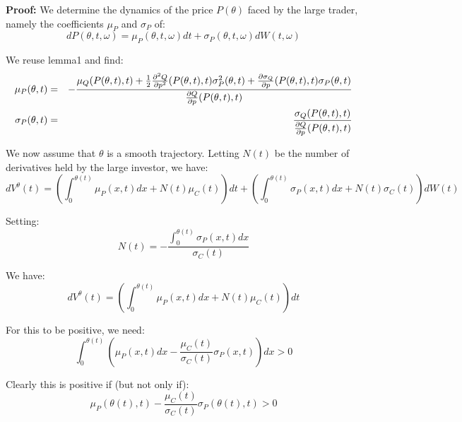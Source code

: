 \documentclass{article}
\begin{document}
\bigskip

\textbf{Proof:} We determine the dynamics of the price $P(\theta )$ faced by
the large trader, namely the coefficients $\mu _{P}$ and $\sigma _{P}$ of:%
\begin{equation*}
dP(\theta ,t,\omega )=\mu _{P}(\theta ,t,\omega )dt+\sigma _{P}(\theta
,t,\omega )dW(t,\omega )
\end{equation*}

We reuse lemma1 and find:%
\begin{eqnarray*}
\mu _{P}(\theta ,t) &=&-\frac{\mu _{Q}(P(\theta ,t),t)+\frac{1}{2}\frac{%
\partial ^{2}Q}{\partial p^{2}}(P(\theta ,t),t)\sigma _{P}^{2}(\theta ,t)+%
\frac{\partial \sigma _{Q}}{\partial p}(P(\theta ,t),t)\sigma _{P}(\theta ,t)%
}{\frac{\partial Q}{\partial p}(P(\theta ,t),t)} \\
\sigma _{P}(\theta ,t) &=&\frac{\sigma _{Q}(P(\theta ,t),t)}{\frac{\partial Q%
}{\partial p}(P(\theta ,t),t)}
\end{eqnarray*}

We now assume that $\theta $ is a smooth trajectory. Letting $N(t)$ be the
number of derivatives held by the large investor, we have:%
\begin{equation*}
dV^{\theta }(t)=\left( \int_{0}^{\theta (t)}\mu _{P}(x,t)dx+N(t)\mu
_{C}(t)\right) dt+\left( \int_{0}^{\theta (t)}\sigma _{P}(x,t)dx+N(t)\sigma
_{C}(t)\right) dW(t)
\end{equation*}

Setting:%
\begin{equation*}
N(t)=-\frac{\int_{0}^{\theta (t)}\sigma _{P}(x,t)dx}{\sigma _{C}(t)}
\end{equation*}%
\bigskip

We have:%
\begin{equation*}
dV^{\theta }(t)=\left( \int_{0}^{\theta (t)}\mu _{P}(x,t)dx+N(t)\mu
_{C}(t)\right) dt
\end{equation*}

For this to be positive, we need:%
\begin{equation*}
\int_{0}^{\theta (t)}\left( \mu _{P}(x,t)dx-\frac{\mu _{C}(t)}{\sigma _{C}(t)%
}\sigma _{P}(x,t)\right) dx>0
\end{equation*}

Clearly this is positive if (but not only if):%
\begin{equation*}
\mu _{P}(\theta (t),t)-\frac{\mu _{C}(t)}{\sigma _{C}(t)}\sigma _{P}(\theta
(t),t)>0
\end{equation*}
\end{document}
